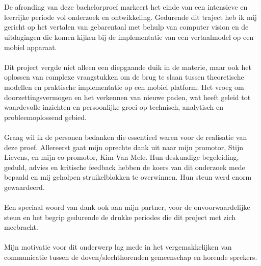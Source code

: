 
\chapter*{}%
\label{ch:voorwoord}


De afronding van deze bachelorproef markeert het einde van een intensieve en leerrijke periode vol onderzoek en ontwikkeling. Gedurende dit traject heb ik mij gericht op het vertalen van gebarentaal met behulp van computer vision en de uitdagingen die komen kijken bij de implementatie van een vertaalmodel op een mobiel apparaat.
\\
\\
Dit project vergde niet alleen een diepgaande duik in de materie, maar ook het oplossen van complexe vraagstukken om de brug te slaan tussen theoretische modellen en praktische implementatie op een mobiel platform. Het vroeg om doorzettingsvermogen en het verkennen van nieuwe paden, wat heeft geleid tot waardevolle inzichten en persoonlijke groei op technisch, analytisch en probleemoplossend gebied.
\\
\\
Graag wil ik de personen bedanken die essentieel waren voor de realisatie van deze proef. Allereerst gaat mijn oprechte dank uit naar mijn promotor, Stijn Lievens, en mijn co-promotor, Kim Van Mele. Hun deskundige begeleiding, geduld, advies en kritische feedback hebben de koers van dit onderzoek mede bepaald en mij geholpen struikelblokken te overwinnen. Hun steun werd enorm gewaardeerd.
\\
\\
Een speciaal woord van dank ook aan mijn partner, voor de onvoorwaardelijke steun en het begrip gedurende de drukke periodes die dit project met zich meebracht.
\\
\\
Mijn motivatie voor dit onderwerp lag mede in het vergemakkelijken van communicatie tussen de doven/slechthorenden gemeenschap en horende sprekers.